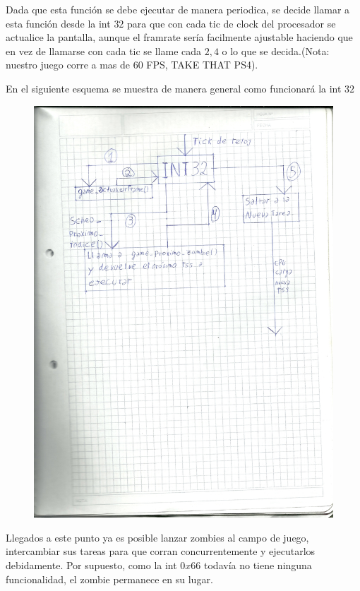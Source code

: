 \documentclass[a4paper]{article}
\begin{document}
Dada que esta función se debe ejecutar de manera periodica, se decide llamar a esta función desde la int $32$ para que con cada tic de clock del procesador se actualice la pantalla, aunque el framrate sería facilmente ajustable haciendo que en vez de llamarse con cada tic se llame cada $2, 4$ o lo que se decida.(Nota: nuestro juego corre a mas de 60 FPS, TAKE THAT PS4).

En el siguiente esquema se muestra de manera general como funcionará la int $32$

\begin{figure}[h!]
  \begin{center}
\includegraphics[scale=0.7]{Dibujos/dibujo2.jpg}\\
  \end{center}
\end{figure}


Llegados a este punto ya es posible lanzar zombies al campo de juego, intercambiar sus tareas para que corran concurrentemente y ejecutarlos debidamente. Por supuesto, como la int $0x66$ todavía no tiene ninguna funcionalidad, el zombie permanece en su lugar.
\end{document}

